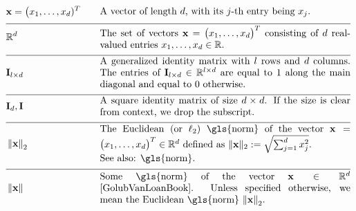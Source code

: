 \begin{align} 
	 &\featurevec=\big(\feature_{1},\ldots,\feature_{\featuredim})^{T} &\quad & \parbox{.75\textwidth}{A vector of length $\featuredim$, with its 
		$\featureidx$-th entry being $\feature_{\featureidx}$.} \nonumber \\[2mm] \hline \nonumber\\[-5mm]
	&\mathbb{R}^{\featuredim} & \quad &  \parbox{.75\textwidth}{The set of vectors $\featurevec=\big(\feature_{1},\ldots,\feature_{\featurelen}\big)^{T}$ consisting of 
		$\featuredim$ real-valued entries $\feature_{1},\ldots,\feature_{\featurelen} \in \mathbb{R}$.} \nonumber \\[2mm] \hline \nonumber\\[-5mm]
	&\mathbf{I}_{\modelidx \times \featuredim}  & \quad &  \parbox{.75\textwidth}{A generalized identity matrix 
		with $\modelidx$ rows and $\featuredim$ columns. The entries of $\mathbf{I}_{\modelidx \times \featuredim} \in \mathbb{R}^{\modelidx \times \featuredim}$ 
		are equal to $1$ along the main diagonal and equal to $0$ otherwise. }\nonumber \\[2mm] \hline \nonumber\\[-5mm] %
	&\mathbf{I}_{\dimlocalmodel}, \mathbf{I} & \quad &  \parbox{.75\textwidth}{A square identity 
		matrix of size $\dimlocalmodel \times \dimlocalmodel$. If the size is clear from 
		context, we drop the subscript.} \nonumber \\[2mm] \hline \nonumber\\[-5mm]
	&\normgeneric{\featurevec}{2}  &\quad & \parbox{.75\textwidth}{The Euclidean (or $\ell_{2}$) \gls{norm} of the vector 
		$\featurevec=\big(\feature_{1},\ldots,\feature_{\featurelen}\big)^{T} \in \mathbb{R}^{\featuredim}$ defined as 
		$ \| \featurevec \|_{2} \defeq \sqrt{\sum_{\featureidx=1}^{\featuredim} \feature_{\featureidx}^{2}}$.
		\\ See also: \gls{norm}. } \nonumber \\[2mm] \hline \nonumber\\[-5mm] 
	&\normgeneric{\featurevec}{}  & \quad &  \parbox{.75\textwidth}{Some \gls{norm} of the vector $\featurevec \in \mathbb{R}^{\featuredim}$ \cite{GolubVanLoanBook}. 
		Unless specified otherwise, we mean the Euclidean \gls{norm} $\normgeneric{\featurevec}{2}$.
}
\end{align}

